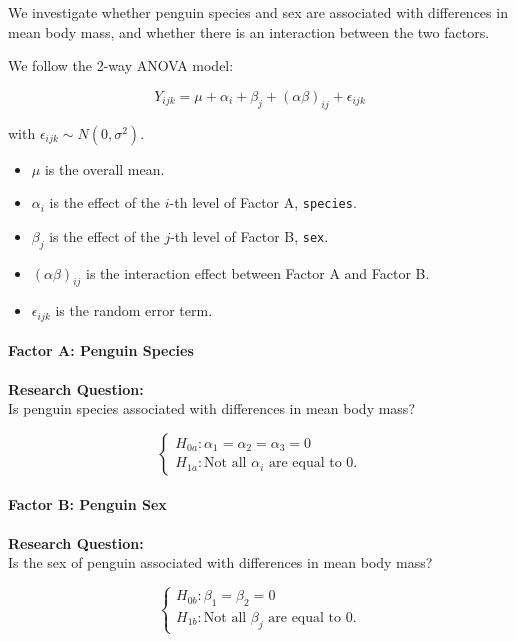 \documentclass[
  11pt,
]{article}
\providecommand{\tightlist}{%
  \setlength{\itemsep}{0pt}\setlength{\parskip}{0pt}}
\begin{document}
We investigate whether penguin species and sex are associated with
differences in mean body mass, and whether there is an interaction
between the two factors.

We follow the 2-way ANOVA model:

\[
Y_{ijk} = \mu + \alpha_i + \beta_j + (\alpha\beta)_{ij} + \epsilon_{ijk}
\]

with \(\epsilon_{ijk} \sim N(0,\sigma^2)\).

\begin{itemize}
\tightlist
\item
  \(\mu\) is the overall mean.
\item
  \(\alpha_i\) is the effect of the \(i\)-th level of Factor A,
  \texttt{species}.
\item
  \(\beta_j\) is the effect of the \(j\)-th level of Factor B,
  \texttt{sex}.
\item
  \((\alpha\beta)_{ij}\) is the interaction effect between Factor A and
  Factor B.
\item
  \(\epsilon_{ijk}\) is the random error term.
\end{itemize}

\paragraph{Factor A: Penguin Species}\label{factor-a-penguin-species}

\textbf{Research Question:}\\
Is penguin species associated with differences in mean body mass?

\[
\begin{cases}
H_{0a}: \alpha_1 = \alpha_2 =  \alpha_3 = 0\\
H_{1a}: \text{Not all } \alpha_i \text{ are equal to }0.
\end{cases}
\]

\paragraph{Factor B: Penguin Sex}\label{factor-b-penguin-sex}

\textbf{Research Question:}\\
Is the sex of penguin associated with differences in mean body mass?

\[
\begin{cases}
H_{0b}: \beta_1 = \beta_2 = 0\\
H_{1b}: \text{Not all } \beta_j \text{ are equal to } 0.
\end{cases}
\]
\end{document}
